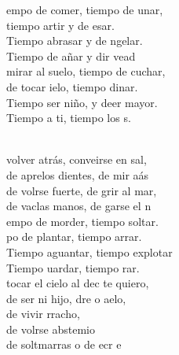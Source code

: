 \documentclass[12pt]{article}
\begin{document}
\begin{multicols*}{2}
\begin{cancion}
	\begin{chorus}%
	empo de comer, tiempo de unar,\\
	tiempo artir y de esar.\\
	Tiempo  abrasar y de ngelar.\\
	Tiempo de añar y dir vead\\
	 mirar al suelo, tiempo de cuchar,\\
	de tocar ielo, tiempo dinar.\\
	Tiempo  ser niño, y deer mayor.\\
	Tiempo a ti, tiempo  los s.\\
	\end{chorus}%
	\jump\\
	 volver atrás, conveirse en sal,\\
	de aprelos dientes, de mir aás\\
	de volrse fuerte, de grir al mar,\\
	de vaclas manos, de garse el n\\
	empo de morder, tiempo  soltar.\\
	po de plantar, tiempo  arrar.\\
	Tiempo  aguantar, tiempo  explotar\\
	Tiempo uardar, tiempo  rar.\\
	 tocar el cielo al dec te quiero,\\
	de ser ni hijo, dre o aelo,\\
	de vivir rracho, \\
	de volrse abstemio\\
	de soltmarras o de ecr  e\\\jump\\

\end{cancion}
\end{multicols*}
\end{document}
